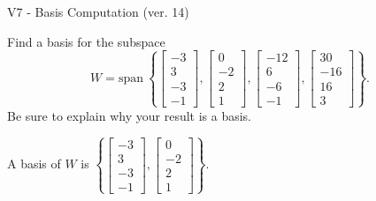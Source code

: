 \begin{exercise}
  \begin{exerciseTitle}V7 - Basis Computation (ver. 14)\end{exerciseTitle}
  \begin{exerciseStatement}
    Find a basis for the subspace 
\[W=\mathrm{span}\ \left\{\left[\begin{array}{r}
-3 \\
3 \\
-3 \\
-1
\end{array}\right] , \left[\begin{array}{r}
0 \\
-2 \\
2 \\
1
\end{array}\right] , \left[\begin{array}{r}
-12 \\
6 \\
-6 \\
-1
\end{array}\right] , \left[\begin{array}{r}
30 \\
-16 \\
16 \\
3
\end{array}\right]\right\}.\]
 Be sure to explain why your result is a basis.


  \end{exerciseStatement}
  \begin{exerciseAnswer}
   A basis of \(W\) is  \(\left\{\left[\begin{array}{r}
-3 \\
3 \\
-3 \\
-1
\end{array}\right] , \left[\begin{array}{r}
0 \\
-2 \\
2 \\
1
\end{array}\right]\right\}\).
  


  \end{exerciseAnswer}
\end{exercise}